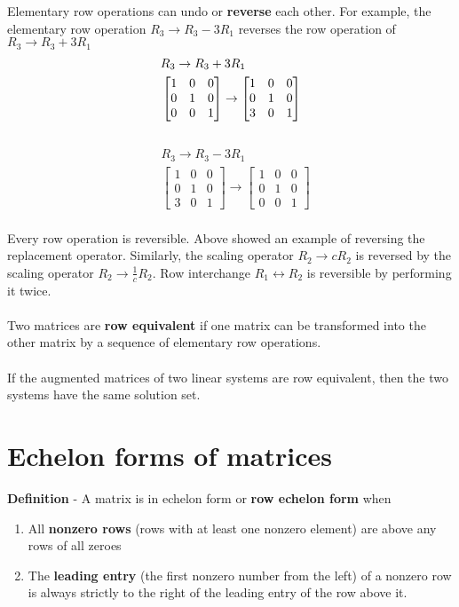 Elementary row operations can undo or \textbf{reverse} each other. For example, the elementary row operation $R_3 \rightarrow R_3 - 3R_1$ reverses the row operation of $R_3 \rightarrow R_3 + 3R_1$
\[
  \begin{aligned}
    &R_3 \rightarrow R_3 + 3R_1 \\
    &\begin{bmatrix}
      1 & 0 & 0 \\
      0 & 1 & 0 \\
      0 & 0 & 1
    \end{bmatrix} \rightarrow
    \begin{bmatrix}
      1 & 0 & 0 \\
      0 & 1 & 0 \\
      3 & 0 & 1
    \end{bmatrix}
  \end{aligned} \\
\] \\
\[
  \begin{aligned}
    &R_3 \rightarrow R_3 - 3R_1 \\
    &\begin{bmatrix}
      1 & 0 & 0 \\
      0 & 1 & 0 \\
      3 & 0 & 1
    \end{bmatrix} \rightarrow
    \begin{bmatrix}
      1 & 0 & 0 \\
      0 & 1 & 0 \\
      0 & 0 & 1
    \end{bmatrix}
  \end{aligned}
\] \\
Every row operation is reversible. Above showed an example of reversing the replacement operator. 
Similarly, the scaling operator $R_2 \rightarrow cR_2$ is reversed by the scaling operator $R_2 \rightarrow \frac{1}{c}R_2$. 
Row interchange $R_1 \leftrightarrow R_2$ is reversible by performing it twice. \\\\
Two matrices are \textbf{row equivalent} if one matrix can be transformed into the other matrix by a sequence of elementary row operations. \\\\
If the augmented matrices of two linear systems are row equivalent, then the two systems have the same solution set.
\section{Echelon forms of matrices}
\textbf{Definition} - A matrix is in echelon form or \textbf{row echelon form} when
\begin{enumerate}
  \item All \textbf{nonzero rows} (rows with at least one nonzero element) are above any rows of all zeroes
  \item The \textbf{leading entry} (the first nonzero number from the left) of a nonzero row is always strictly to the right of the leading entry of the row above it.
\end{enumerate}
